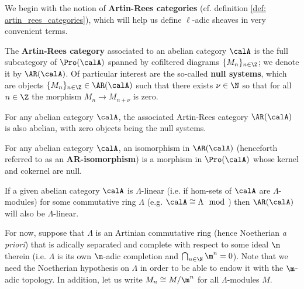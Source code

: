         We begin with the notion of \textbf{Artin-Rees categories} (cf. definition \ref{def: artin_rees_categories}), which will help us define $\ell$-adic sheaves in very convenient terms. 
        \begin{definition} \label{def: artin_rees_categories}
            The \textbf{Artin-Rees category} associated to an abelian category $\calA$ is the full subcategory of $\Pro(\calA)$ spanned by cofiltered diagrams $\{M_n\}_{n \in \Z}$; we denote it by $\AR(\calA)$. Of particular interest are the so-called \textbf{null systems}, which are objects $\{M_n\}_{n \in \Z} \in \AR(\calA)$ such that there exists $\nu \in \N$ so that for all $n \in \Z$ the morphism $M_n \to M_{n + \nu}$ is zero.
        \end{definition}
        \begin{proposition} \label{prop: artin_rees_categories_are_abelian}
            For any abelian category $\calA$, the associated Artin-Rees category $\AR(\calA)$ is also abelian, with zero objects being the null systems.
        \end{proposition}
        \begin{corollary}[AR-isomorphisms] \label{coro: AR_isomorphisms}
            For any abelian category $\calA$, an isomorphism in $\AR(\calA)$ (henceforth referred to as an \textbf{AR-isomorphism}) is a morphism in $\Pro(\calA)$ whose kernel and cokernel are null.
        \end{corollary}
        \begin{proposition} \label{prop: artin_rees_categories_are_linear}
            If a given abelian category $\calA$ is $\Lambda$-linear (i.e. if hom-sets of $\calA$ are $\Lambda$-modules) for some commutative ring $\Lambda$ (e.g. $\calA \cong \Lambda\mod$) then $\AR(\calA)$ will also be $\Lambda$-linear.
        \end{proposition}
        \begin{convention} \label{conv: complete_artinian_ring}
            For now, suppose that $\Lambda$ is an Artinian commutative ring (hence Noetherian \textit{a priori}) that is adically separated and complete with respect to some ideal $\m$ therein (i.e. $\Lambda$ is its own $\m$-adic completion and $\bigcap_{n \in \N} \m^n = 0$). Note that we need the Noetherian hypothesis on $\Lambda$ in order to be able to endow it with the $\m$-adic topology. In addition, let us write $M_n \cong M/\m^n$ for all $\Lambda$-modules $M$.
        \end{convention}
